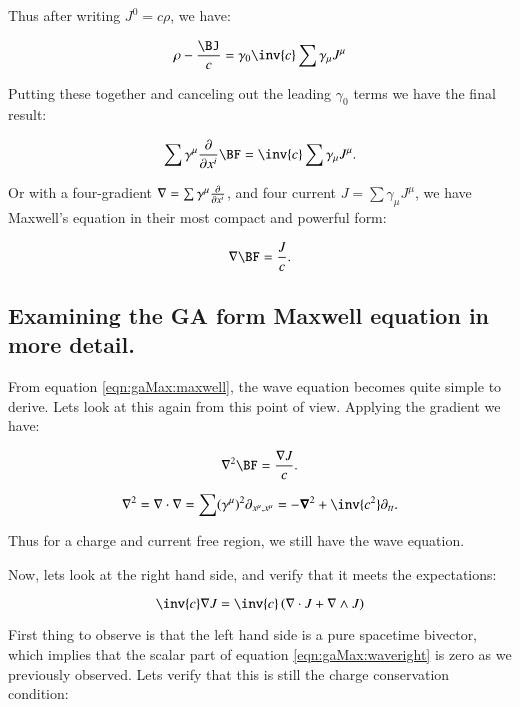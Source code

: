 Thus after writing $J^0 = c \rho$, we have:

\begin{equation*}
\rho - \frac{\BJ}{c} = \gamma_0 \inv{c} \sum \gamma_{\mu} J^{\mu}
\end{equation*}

Putting these together and canceling out the leading $\gamma_0$ terms we have the final result:

\begin{equation}
\sum \gamma^{\mu} \frac{\partial}{\partial x^i} \BF = \inv{c} \sum \gamma_{\mu} J^{\mu}.
\end{equation}

Or with a four-gradient $\nabla = \sum \gamma^{\mu} \frac{\partial}{\partial x^i}$, and four current $J = \sum \gamma_{\mu} J^{\mu}$, we have Maxwell's equation in their most compact and powerful form:

\begin{equation}\label{eqn:gaMax:maxwell}
\grad \BF = \frac{J}{c}.
\end{equation}

\subsection{Examining the GA form Maxwell equation in more detail. }

From equation \ref{eqn:gaMax:maxwell}, the wave equation becomes quite simple to derive.  Lets look at this again from this point of
view.  Applying the gradient we have:

\begin{equation}
\grad^2 \BF = \frac{\grad J}{c}.
\end{equation}

\begin{equation}
\grad^2 = \grad \cdot \grad = \sum (\gamma^{\mu})^2 \partial_{x^{\mu},x^{\mu}} = -\spacegrad^2 + \inv{c^2}\partial_{tt}.
\end{equation}

Thus for a charge and current free region, we still have the wave equation.

Now, lets look at the right hand side, and verify that it meets the expectations:

\begin{equation}\label{eqn:gaMax:waveright}
\inv{c}\grad J = \inv{c}\left(\grad \cdot J + \grad \wedge J\right)
\end{equation}

First thing to observe is that the left hand side is a pure spacetime bivector, which implies that the scalar part of 
equation \ref{eqn:gaMax:waveright} is zero as we previously observed.  Lets verify that this is still the charge conservation
condition:

